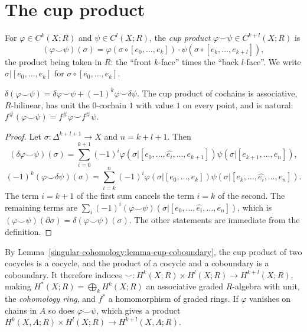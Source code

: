 \section{The cup product}\label{singular-cohomology:section-cup}

\begin{definition}\label{singular-cohomology:definition-cup}
For $\varphi \in C^k(X; R)$ and $\psi \in C^l(X; R)$, the \emph{cup product} $\varphi \smile \psi \in C^{k+l}(X; R)$ is
\[
(\varphi \smile \psi)(\sigma) = \varphi(\sigma \circ [e_0, \ldots, e_k]) \cdot \psi(\sigma \circ [e_k, \ldots, e_{k+l}]),
\]
the product being taken in $R$: the ``front $k$-face'' times the ``back $l$-face''. We write $\sigma|[e_0, \ldots, e_k]$ for $\sigma \circ [e_0, \ldots, e_k]$.
\end{definition}

\begin{lemma}\label{singular-cohomology:lemma-cup-coboundary}
$\delta(\varphi \smile \psi) = \delta\varphi \smile \psi + (-1)^k\varphi \smile \delta\psi$. The cup product of cochains is associative, $R$-bilinear, has unit the $0$-cochain $1$
with value $1$ on every point, and is natural: $f^\#(\varphi \smile \psi) = f^\#\varphi \smile f^\#\psi$.
\end{lemma}

\begin{proof}
Let $\sigma \colon \Delta^{k+l+1} \to X$ and $n = k + l + 1$. Then
\[
(\delta\varphi \smile \psi)(\sigma) = \sum_{i=0}^{k+1}(-1)^i\varphi(\sigma|[e_0, \ldots, \widehat{e_i}, \ldots, e_{k+1}])\psi(\sigma|[e_{k+1}, \ldots, e_n]),
\]
\[
(-1)^k(\varphi \smile \delta\psi)(\sigma) = \sum_{i=k}^{n}(-1)^i\varphi(\sigma|[e_0, \ldots, e_k])\psi(\sigma|[e_k, \ldots, \widehat{e_i}, \ldots, e_n]).
\]
The term $i = k + 1$ of the first sum cancels the term $i = k$ of the second. The remaining terms are $\sum_i (-1)^i(\varphi \smile \psi)(\sigma|[e_0, \ldots, \widehat{e_i}, \ldots, e_n])$,
which is $(\varphi \smile \psi)(\partial\sigma) = \delta(\varphi \smile \psi)(\sigma)$. The other statements are immediate from the definition.
\end{proof}

\begin{definition}\label{singular-cohomology:definition-cohomology-ring}
By Lemma~\ref{singular-cohomology:lemma-cup-coboundary}, the cup product of two cocycles is a cocycle, and the product of a cocycle and a coboundary is a coboundary. It
therefore induces $\smile \colon H^k(X; R) \times H^l(X; R) \to H^{k+l}(X; R)$, making $H^*(X; R) = \bigoplus_k H^k(X; R)$ an associative graded $R$-algebra with unit, the
\emph{cohomology ring}, and $f^*$ a homomorphism of graded rings. If $\varphi$ vanishes on chains in $A$ so does $\varphi \smile \psi$, which gives a product
$H^k(X, A; R) \times H^l(X; R) \to H^{k+l}(X, A; R)$.
\end{definition}

